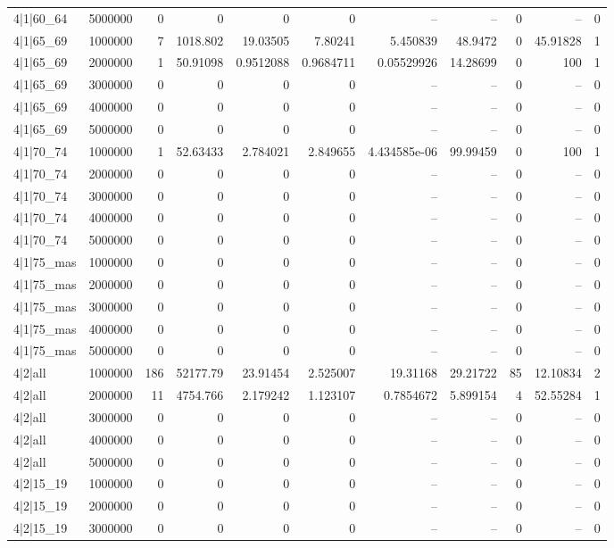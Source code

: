 \begin{tabular}{lrrrrrrrrrr}
4|1|60\_64 & 5000000 & 0 & 0 & 0 & 0 & -- & -- & 0 & -- & 0 \\
4|1|65\_69 & 1000000 & 7 & 1018.802 & 19.03505 & 7.80241 & 5.450839 & 48.9472 & 0 & 45.91828 & 1 \\
4|1|65\_69 & 2000000 & 1 & 50.91098 & 0.9512088 & 0.9684711 & 0.05529926 & 14.28699 & 0 & 100 & 1 \\
4|1|65\_69 & 3000000 & 0 & 0 & 0 & 0 & -- & -- & 0 & -- & 0 \\
4|1|65\_69 & 4000000 & 0 & 0 & 0 & 0 & -- & -- & 0 & -- & 0 \\
4|1|65\_69 & 5000000 & 0 & 0 & 0 & 0 & -- & -- & 0 & -- & 0 \\
4|1|70\_74 & 1000000 & 1 & 52.63433 & 2.784021 & 2.849655 & 4.434585e-06 & 99.99459 & 0 & 100 & 1 \\
4|1|70\_74 & 2000000 & 0 & 0 & 0 & 0 & -- & -- & 0 & -- & 0 \\
4|1|70\_74 & 3000000 & 0 & 0 & 0 & 0 & -- & -- & 0 & -- & 0 \\
4|1|70\_74 & 4000000 & 0 & 0 & 0 & 0 & -- & -- & 0 & -- & 0 \\
4|1|70\_74 & 5000000 & 0 & 0 & 0 & 0 & -- & -- & 0 & -- & 0 \\
4|1|75\_mas & 1000000 & 0 & 0 & 0 & 0 & -- & -- & 0 & -- & 0 \\
4|1|75\_mas & 2000000 & 0 & 0 & 0 & 0 & -- & -- & 0 & -- & 0 \\
4|1|75\_mas & 3000000 & 0 & 0 & 0 & 0 & -- & -- & 0 & -- & 0 \\
4|1|75\_mas & 4000000 & 0 & 0 & 0 & 0 & -- & -- & 0 & -- & 0 \\
4|1|75\_mas & 5000000 & 0 & 0 & 0 & 0 & -- & -- & 0 & -- & 0 \\
4|2|all & 1000000 & 186 & 52177.79 & 23.91454 & 2.525007 & 19.31168 & 29.21722 & 85 & 12.10834 & 2 \\
4|2|all & 2000000 & 11 & 4754.766 & 2.179242 & 1.123107 & 0.7854672 & 5.899154 & 4 & 52.55284 & 1 \\
4|2|all & 3000000 & 0 & 0 & 0 & 0 & -- & -- & 0 & -- & 0 \\
4|2|all & 4000000 & 0 & 0 & 0 & 0 & -- & -- & 0 & -- & 0 \\
4|2|all & 5000000 & 0 & 0 & 0 & 0 & -- & -- & 0 & -- & 0 \\
4|2|15\_19 & 1000000 & 0 & 0 & 0 & 0 & -- & -- & 0 & -- & 0 \\
4|2|15\_19 & 2000000 & 0 & 0 & 0 & 0 & -- & -- & 0 & -- & 0 \\
4|2|15\_19 & 3000000 & 0 & 0 & 0 & 0 & -- & -- & 0 & -- & 0 \\

\end{tabular}
